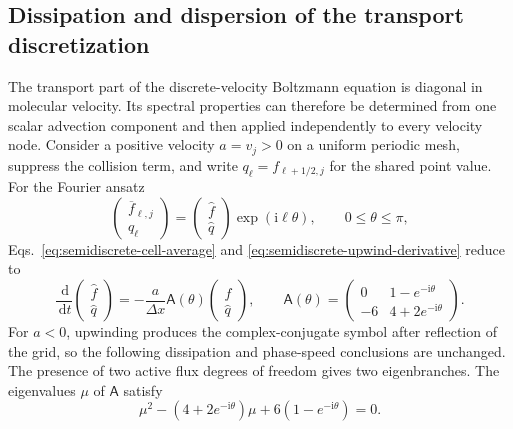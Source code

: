 \documentclass[preprint,3p,12pt]{elsarticle}
\newcommand{\dd}{\,\mathrm{d}}
\newcommand{\avg}[1]{\overline{#1}}
\begin{document}
\subsection{Dissipation and dispersion of the transport discretization}
\label{sec:transport-spectrum}

The transport part of the discrete-velocity Boltzmann equation is diagonal in molecular velocity. Its spectral properties can therefore be determined from one scalar advection component and then applied independently to every velocity node. Consider a positive velocity $a=v_j>0$ on a uniform periodic mesh, suppress the collision term, and write $q_\ell=f_{\ell+1/2,j}$ for the shared point value. For the Fourier ansatz
\begin{equation}
  \begin{pmatrix}\avg{f}_{\ell,j}\\q_\ell\end{pmatrix}
  =
  \begin{pmatrix}\widehat{f}\\\widehat{q}\end{pmatrix}
  \exp(\mathrm{i}\ell\theta),
  \qquad 0\leq\theta\leq\pi,
  \label{eq:active-flux-fourier-ansatz}
\end{equation}
Eqs.~\eqref{eq:semidiscrete-cell-average} and \eqref{eq:semidiscrete-upwind-derivative} reduce to
\begin{equation}
  \frac{\dd}{\dd t}
  \begin{pmatrix}\widehat{f}\\\widehat{q}\end{pmatrix}
  =-\frac{a}{\Delta x}\mathsf{A}(\theta)
  \begin{pmatrix}\widehat{f}\\\widehat{q}\end{pmatrix},
  \qquad
  \mathsf{A}(\theta)=
  \begin{pmatrix}
    0 & 1-e^{-\mathrm{i}\theta}\\
    -6 & 4+2e^{-\mathrm{i}\theta}
  \end{pmatrix}.
  \label{eq:active-flux-fourier-symbol}
\end{equation}
For $a<0$, upwinding produces the complex-conjugate symbol after reflection of the grid, so the following dissipation and phase-speed conclusions are unchanged. The presence of two active flux degrees of freedom gives two eigenbranches. The eigenvalues $\mu$ of $\mathsf{A}$ satisfy
\begin{equation}
  \mu^2-\left(4+2e^{-\mathrm{i}\theta}\right)\mu
  +6\left(1-e^{-\mathrm{i}\theta}\right)=0.
  \label{eq:active-flux-dispersion-relation}
\end{equation}
\end{document}
